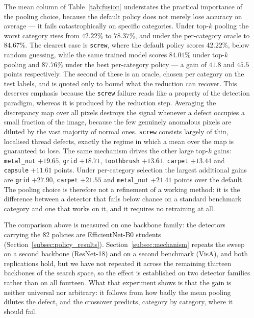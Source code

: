 The mean column of Table~\ref{tab:fusion} understates the practical importance of
the pooling choice, because the default policy does not merely lose accuracy on
average --- it fails catastrophically on specific categories. Under top-$k$
pooling the worst category rises from $42.22\%$ to $78.37\%$, and under the
per-category oracle to $84.67\%$. The clearest case is \texttt{screw}, where the
default policy scores $42.22\%$, below random guessing, while the same trained
model scores $84.01\%$ under top-$k$ pooling and $87.76\%$ under the best
per-category policy --- a gain of $41.8$ and $45.5$ points respectively. The
second of these is an oracle, chosen per category on the test labels, and is
quoted only to bound what the reduction can recover. This
deserves emphasis because the \texttt{screw} failure reads like a property of the
detection paradigm, whereas it is produced by the reduction step. Averaging the discrepancy map over all pixels
destroys the signal whenever a defect occupies a small fraction of the image,
because the few genuinely anomalous pixels are diluted by the vast majority of
normal ones. \texttt{screw} consists largely of thin, localised thread defects,
exactly the regime in which a mean over the map is guaranteed to lose. The same
mechanism drives the other large top-$k$ gains: \texttt{metal\_nut} $+19.65$,
\texttt{grid} $+18.71$, \texttt{toothbrush} $+13.61$, \texttt{carpet} $+13.44$ and
\texttt{capsule} $+11.61$ points. Under per-category selection the largest
additional gains are \texttt{grid} $+27.90$, \texttt{carpet} $+21.55$ and
\texttt{metal\_nut} $+21.41$ points over the default. The pooling choice is
therefore not a refinement of a working method: it is the difference between a
detector that fails below chance on a standard benchmark category and one that
works on it, and it requires no retraining at all.

The comparison above is measured on one backbone family: the detectors carrying
the 82 policies are EfficientNet-B0 students
(Section~\ref{subsec:policy_results}). Section~\ref{subsec:mechanism} repeats the
sweep on a second backbone (ResNet-18) and on a second benchmark (VisA), and both
replications hold, but we have not repeated it across the remaining thirteen
backbones of the search space, so the effect is established on two detector
families rather than on all fourteen. What that experiment shows is that the gain is neither universal nor
arbitrary: it follows from how badly the mean pooling dilutes the defect, and the
crossover predicts, category by category, where it should fail.

